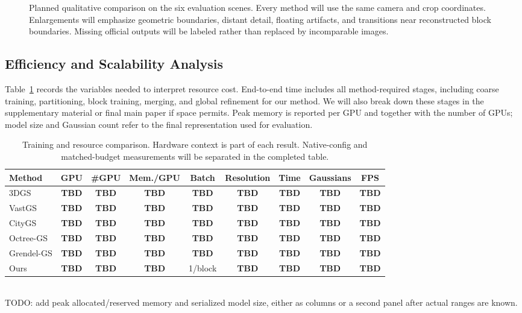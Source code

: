 \documentclass[conference]{IEEEtran}
\newcommand{\TBD}{\textbf{TBD}}
\begin{document}
\begin{figure}[t]
    \centering
    \caption{Planned qualitative comparison on the six evaluation scenes. Every method will use the same camera and crop coordinates. Enlargements will emphasize geometric boundaries, distant detail, floating artifacts, and transitions near reconstructed block boundaries. Missing official outputs will be labeled rather than replaced by incomparable images.}
    \label{fig:qualitative}
\end{figure}

\subsection{Efficiency and Scalability Analysis}

Table~\ref{tab:efficiency} records the variables needed to interpret resource cost. End-to-end time includes all method-required stages, including coarse training, partitioning, block training, merging, and global refinement for our method. We will also break down these stages in the supplementary material or final main paper if space permits. Peak memory is reported per GPU and together with the number of GPUs; model size and Gaussian count refer to the final representation used for evaluation.

\begin{table}[t]
\caption{Training and resource comparison. Hardware context is part of each result. Native-config and matched-budget measurements will be separated in the completed table.}
\label{tab:efficiency}
\centering
\setlength{\tabcolsep}{3.5pt}
\begin{tabular}{lcccccccc}
\toprule
Method & GPU & \#GPU & Mem./GPU & Batch & Resolution & Time & Gaussians & FPS \\
\midrule
3DGS & \TBD & \TBD & \TBD & \TBD & \TBD & \TBD & \TBD & \TBD \\
VastGS & \TBD & \TBD & \TBD & \TBD & \TBD & \TBD & \TBD & \TBD \\
CityGS & \TBD & \TBD & \TBD & \TBD & \TBD & \TBD & \TBD & \TBD \\
Octree-GS & \TBD & \TBD & \TBD & \TBD & \TBD & \TBD & \TBD & \TBD \\
Grendel-GS & \TBD & \TBD & \TBD & \TBD & \TBD & \TBD & \TBD & \TBD \\
Ours & \TBD & \TBD & \TBD & 1/block & \TBD & \TBD & \TBD & \TBD \\
\bottomrule
\end{tabular}
\\[1mm]
\footnotesize TODO: add peak allocated/reserved memory and serialized model size, either as columns or a second panel after actual ranges are known.
\end{table}
\end{document}
